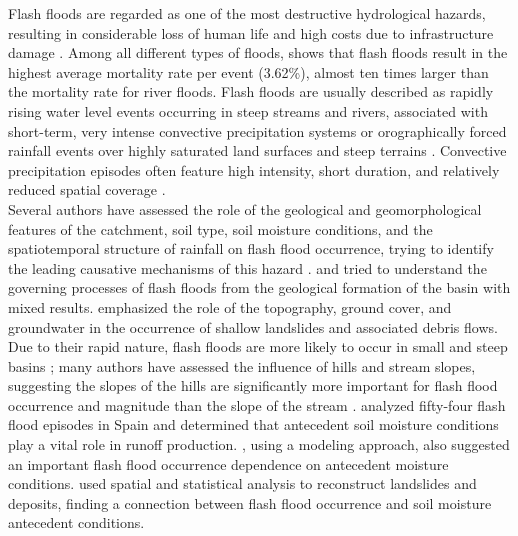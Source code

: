 \documentclass[hess, manuscript]{copernicus}
\begin{document}
Flash floods are regarded as one of the most destructive hydrological hazards, resulting in considerable loss of human life and high costs due to infrastructure damage  \citep{Roux2011, Gruntfest2001}.  Among all different types of floods,  \cite{Jonkman2005} shows that flash floods result in the highest average mortality rate per event (3.62\%), almost ten times larger than the mortality rate for river floods.  Flash floods are usually described as rapidly rising water level events occurring in steep streams and rivers, associated with short-term, very intense convective precipitation systems or orographically forced rainfall events over highly saturated land surfaces and steep terrains \citep{Salek2006, Llasat2016, Douinot2016}. Convective precipitation episodes often feature high intensity, short duration, and relatively reduced spatial coverage \citep{HouzeMCS2004}.   \\

Several authors have assessed the role of the geological and geomorphological features of the catchment, soil type, soil moisture conditions, and the spatiotemporal structure of rainfall on flash flood occurrence, trying to identify the leading causative mechanisms of this hazard \citep{Merz2003}. \citet{Adamovic2016} and \citet{Vannier2016} tried to understand the governing processes of flash floods from the geological formation of the basin with mixed results. \citet{Wu1995} emphasized the role of the topography, ground cover, and groundwater in the occurrence of shallow landslides and associated debris flows. Due to their rapid nature, flash floods are more likely to occur in small and steep basins \citep{Younis2008}; many authors have assessed the influence of hills and stream slopes, suggesting the slopes of the hills are significantly more important for flash flood occurrence and magnitude than the slope of the stream  \citep{Salek2006, Roux2011, Yatheendradas2008}. \citet{Rodriguez2012} analyzed fifty-four flash flood episodes in Spain and determined that antecedent soil moisture conditions play a vital role in runoff production. \citet{Castillo2003}, using a modeling approach, also suggested an important flash flood occurrence dependence on antecedent moisture conditions. \citet{Aronica2012} used spatial and statistical analysis to reconstruct landslides and deposits, finding a connection between flash flood occurrence and soil moisture antecedent conditions.\\
\end{document}
